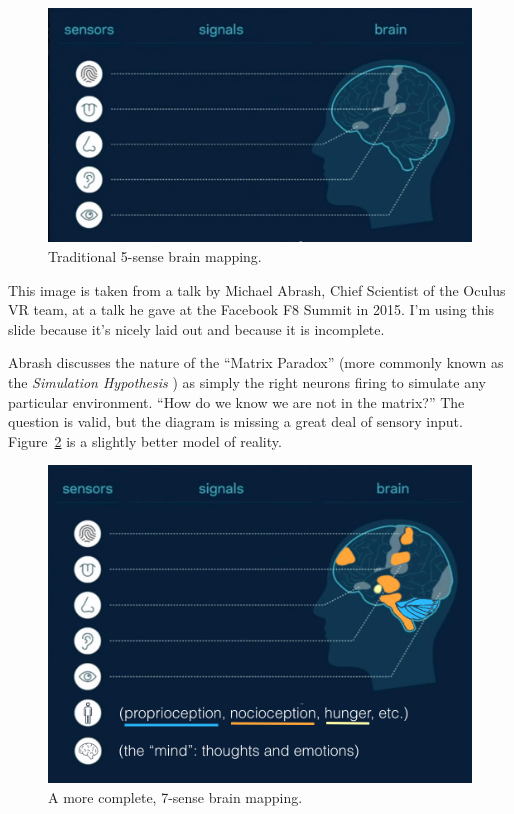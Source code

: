\documentclass{article}
\begin{document}
\begin{figure}[h]
  \centering
  \includegraphics[width=\linewidth]{images/michael-abrash-senses.png}
  \caption{Traditional 5-sense brain mapping.}
  \label{fig:michael-abrash-senses}
\end{figure}

This image is taken from a talk by Michael Abrash, Chief Scientist of the Oculus VR team, at a talk he gave at the Facebook F8 Summit in 2015. \cite{abrashvr} I'm using this slide because it's nicely laid out and because it is incomplete.

Abrash discusses the nature of the ``Matrix Paradox'' (more commonly known as the \textit{Simulation Hypothesis} \cite{simulationhypothesis}) as simply the right neurons firing to simulate any particular environment. ``How do we know we are not in the matrix?'' The question is valid, but the diagram is missing a great deal of sensory input. Figure~\ref{fig:michael-abrash-senses-extended} is a slightly better model of reality.

\begin{figure}[h]
  \centering
  \includegraphics[width=\linewidth]{images/michael-abrash-senses-extended-attached.jpeg}
  \caption{A more complete, 7-sense brain mapping.}
  \label{fig:michael-abrash-senses-extended}
\end{figure}
\end{document}
